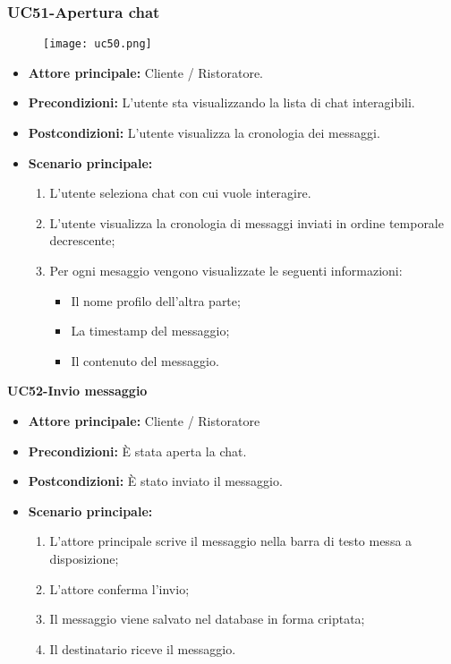 \subsubsection{UC51-Apertura chat}
\begin{figure}[h] \texttt{[image: uc50.png]} \end{figure}
\begin{itemize}
\item \textbf{Attore principale:} Cliente / Ristoratore.
\item \textbf{Precondizioni:} L'utente sta visualizzando la lista di chat interagibili.
\item \textbf{Postcondizioni:} L'utente visualizza la cronologia dei messaggi.
\item \textbf{Scenario principale:}
\begin{enumerate}
    \item L'utente seleziona chat con cui vuole interagire.
    \item L'utente visualizza la cronologia di messaggi inviati in ordine temporale decrescente;
    \item Per ogni mesaggio vengono visualizzate le seguenti informazioni:
      \begin{itemize}
        \item Il nome profilo dell'altra parte;
        \item La timestamp del messaggio;
        \item Il contenuto del messaggio.
      \end{itemize}
\end{enumerate}
\end{itemize}

\textbf{UC52-Invio messaggio}
\begin{itemize}
\item \textbf{Attore principale:} Cliente / Ristoratore
\item \textbf{Precondizioni:} È stata aperta la chat.
\item \textbf{Postcondizioni:} È stato inviato il messaggio.
\item \textbf{Scenario principale:}
\begin{enumerate}
    \item L'attore principale scrive il messaggio nella barra di testo messa a disposizione;
    \item L'attore conferma l'invio;
    \item Il messaggio viene salvato nel database in forma criptata;
    \item Il destinatario riceve il messaggio.
\end{enumerate}
\end{itemize}
